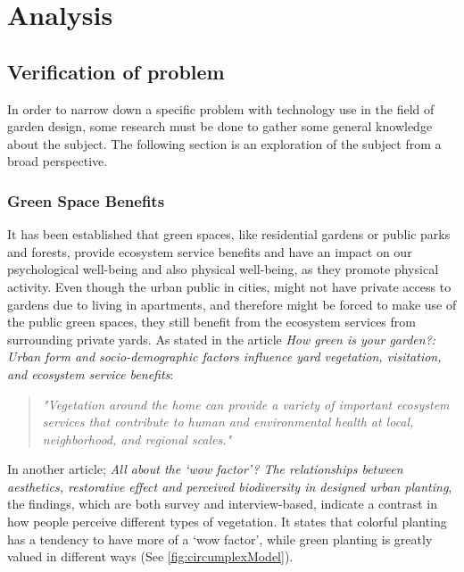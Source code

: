  \chapter{Analysis}	
		
	\section{Verification of problem}\label{sec:verification}
	In order to narrow down a specific problem with technology use in the field of garden design, some research must be done to gather some general knowledge about the subject. The following section is an exploration of the subject from a broad perspective.
		
 	\subsection{Green Space Benefits}
	It has been established that green spaces, like residential gardens or public parks and forests, provide ecosystem service benefits and have an impact on our psychological well-being and also physical well-being, as they promote physical activity\cite{urbanGreenSpace}\cite{healthBenefitsNature}. Even though the urban public in cities, might not have private access to gardens due to living in apartments, and therefore might be forced to make use of the public green spaces, they still benefit from the ecosystem services from surrounding private yards\cite{greenSpaceBenefits}. As stated in the article \textit{How green is your garden?: Urban form and socio-demographic factors influence yard vegetation, visitation, and ecosystem service benefits}:\\
	
	\begin{quote}
		\textit{"Vegetation around the home can provide a variety of important ecosystem services that contribute to human and environmental health at local, neighborhood, and regional scales\label{articleQuote}."}\\
	\end{quote}
	
	In another article; \textit{All about the ‘wow factor’? The relationships between aesthetics, restorative effect and perceived biodiversity in designed urban planting}\cite{wowFactor}, the findings, which are both survey and interview-based, indicate a contrast in how people perceive different types of vegetation. It states that colorful planting has a tendency to have more of a ‘wow factor’, while green planting is greatly valued in different ways (See \autoref{fig:circumplexModel}).
	
